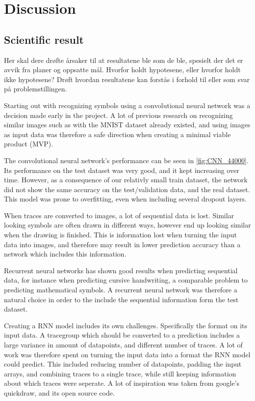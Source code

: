 \chapter{Discussion}

\section{Scientific result}

Her skal dere drøfte årsaker til at resultatene ble som de ble, spesielt der det er avvik fra planer og oppsatte mål. 
Hvorfor holdt hypotesene, eller hvorfor holdt ikke hypotesene? 
Drøft hvordan resultatene kan forstås i forhold til eller som svar på problemstillingen.


Starting out with recognizing symbols using a convolutional neural network was a decision made early in the project. A lot of previous research on recognizing similar images such as with the MNIST dataset already existed, and using images as input data was therefore a safe direction when creating a minimal viable product (MVP). 

The convolutional neural network's performance can be seen in \ref{fig:CNN_44000}. Its performance on the test dataset was very good, and it kept increasing over time. However, as a consequence of our relativly small train dataset, the network did not show the same accuracy on the test/validation data, and the real dataset. This model was prone to overfitting, even when including several dropout layers.


When traces are converted to images, a lot of sequential data is lost. Similar looking symbols are often drawn in different ways, however end up looking similar when the drawing is finished. This is information lost when turning the input data into images, and therefore may result in lower prediction accuracy than a network which includes this information.

Recurrent neural networks has shown good results when predicting sequential data, for instance when predicting cursive handwriting, a comparable problem to predicting mathematical symbols. A recurrent neural network was therefore a natural choice in order to the include the sequential information form the test dataset. 

Creating a RNN model includes its own challenges. Specifically the format on its input data. A tracegroup which should be converted to a prediction includes a large variance in amount of datapoints, and different number of traces. A lot of work was therefore spent on turning the input data into a format the RNN model could predict. This included reducing number of datapoints, padding the input arrays, and combining traces to a single trace, while still keeping information about which traces were seperate. A lot of inspiration was taken from google's quickdraw, and its open source code. \cite{_recurrent_????} 

